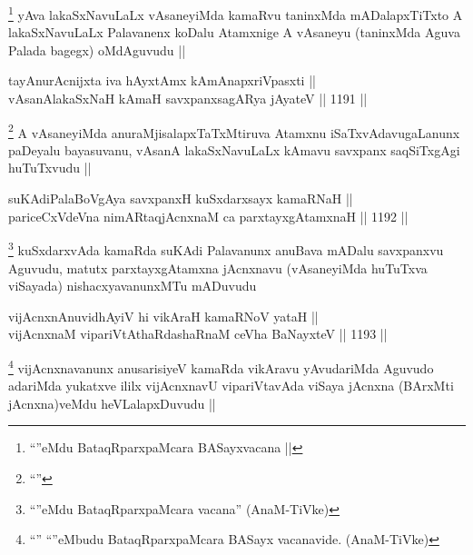 \begin{artha}
\footnote{``\stext''eMdu BataqRparxpaMcara BASayxvacana ||}
yAva lakaSxNavuLaLx vAsaneyiMda kamaRvu taninxMda mADalapxTiTxto A lakaSxNavuLaLx Palavanenx koDalu Atamxnige A vAsaneyu (taninxMda Aguva Palada bagegx) oMdAguvudu ||
\end{artha}

\begin{shl}
tayA\s nurAcnijxta iva hAyxtAmx kAmAnapxriVpasxti || \\
vAsanAlakaSxNaH kAmaH savxpanxsagARya jAyateV ||  1191 || 
\end{shl}

\begin{artha}
\footnote{``\stext''}
A vAsaneyiMda anuraMjisalapxTaTxMtiruva Atamxnu iSaTxvAdavugaLanunx paDeyalu bayasuvanu, vAsanA lakaSxNavuLaLx kAmavu savxpanx saqSiTxgAgi huTuTxvudu ||
\end{artha}


\begin{shl}
suKAdiPalaBoVgAya savxpanxH kuSxdarxsayx kamaRNaH || \\
pariceCxVdeVna nimARtaqjAcnxnaM ca parxtayxgAtamxnaH ||  1192 ||  
\end{shl}

\begin{artha}
\footnote{``\stext''eMdu BataqRparxpaMcara vacana'' (AnaM-TiVke)}
kuSxdarxvAda kamaRda suKAdi Palavanunx anuBava mADalu savxpanxvu Aguvudu, matutx parxtayxgAtamxna jAcnxnavu (vAsaneyiMda huTuTxva viSayada) nishacxyavanunxMTu mADuvudu
\end{artha}


\begin{shl}
vijAcnxnAnuvidhAyiV hi vikAraH kamaRNoV yataH || \\
vijAcnxnaM vipariVtAthaRdashaRnaM ceVha BaNayxteV ||  1193 ||  
\end{shl}

\begin{artha}
\footnote{``\stext'' ``\stext''eMbudu BataqRparxpaMcara BASayx vacanavide. (AnaM-TiVke)}
vijAcnxnavanunx anusarisiyeV kamaRda vikAravu yAvudariMda Aguvudo adariMda yukatxve ililx vijAcnxnavU vipariVtavAda viSaya jAcnxna (BArxMti jAcnxna)veMdu heVLalapxDuvudu ||
\end{artha}

